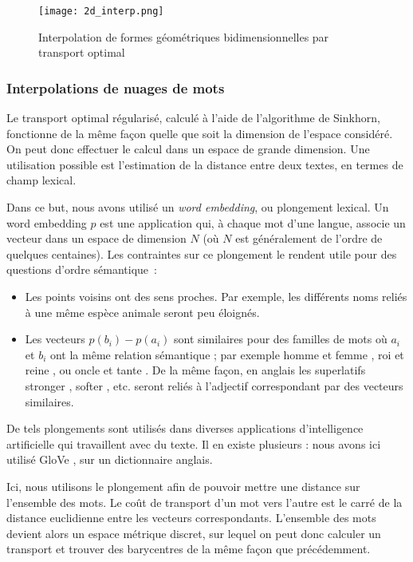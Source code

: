 \begin{figure}
\centering
\texttt{[image: 2d\_interp.png]}
\caption{Interpolation de formes géométriques bidimensionnelles par transport optimal}
\label{fig:2d_interp}
\end{figure}

\subsubsection{Interpolations de nuages de mots}
Le transport optimal régularisé, calculé à l'aide de l'algorithme de Sinkhorn, fonctionne de la même façon quelle que soit la dimension de l'espace considéré. On peut donc effectuer le calcul dans un espace de grande dimension. Une utilisation possible est l'estimation de la distance entre deux textes, en termes de champ lexical.

Dans ce but, nous avons utilisé un \emph{word embedding}, ou plongement lexical. Un word embedding $p$ est une application qui, à chaque mot d'une langue, associe un vecteur dans un espace de dimension $N$ (où $N$ est généralement de l'ordre de quelques centaines). Les contraintes sur ce plongement le rendent utile pour des questions d'ordre sémantique~:
\begin{itemize}
\item Les points voisins ont des sens proches. Par exemple, les différents noms reliés à une même espèce animale seront peu éloignés.
\item Les vecteurs $p(b_i) - p(a_i)$ sont similaires pour des familles de mots où $a_i$ et $b_i$ ont la même relation sémantique ; par exemple \og homme \fg et \og femme \fg, \og roi \fg et \og reine \fg, ou \og oncle \fg et \og tante \fg. De la même façon, en anglais les superlatifs \og stronger \fg, \og softer \fg, etc. seront reliés à l'adjectif correspondant par des vecteurs similaires.
\end{itemize}
De tels plongements sont utilisés dans diverses applications d'intelligence artificielle qui travaillent avec du texte. Il en existe plusieurs : nous avons ici utilisé \og GloVe \fg, sur un dictionnaire anglais.

Ici, nous utilisons le plongement afin de pouvoir mettre une distance sur l'ensemble des mots. Le coût de transport d'un mot vers l'autre est le carré de la distance euclidienne entre les vecteurs correspondants. L'ensemble des mots devient alors un espace métrique discret, sur lequel on peut donc calculer un transport et trouver des barycentres de la même façon que précédemment.

